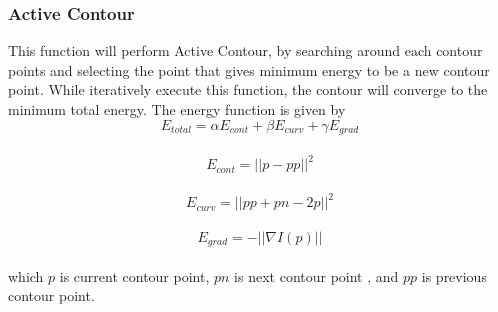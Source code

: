 \documentclass[12pt,a4paper]{report}
\begin{document}
\subsubsection{Active Contour}
This function will perform Active Contour, by searching around each contour points and selecting the point that gives minimum energy to be a new contour point. While iteratively execute this function, the contour will converge to the minimum total energy.
The energy function is given by
\[E_{total}= \alpha E_{cont} + \beta E_{curv} + \gamma E_{grad}\]\\
\[E_{cont} = ||p-pp||^2\]\\
\[E_{curv} = ||pp+pn-2p||^2\]\\
\[E_{grad} = -||\nabla I(p)||\]\\
which \(p\) is current contour point, \(pn\) is next contour point , and \(pp\) is previous contour point.
\end{document}
